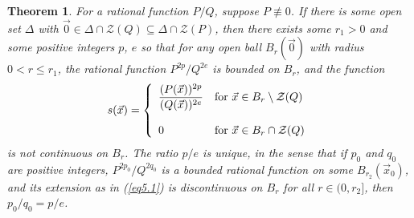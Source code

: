 \documentclass[12pt]{amsart}
\newtheorem{thm}{Theorem}[section]
\theoremstyle{definition}
\theoremstyle{remark}
\numberwithin{equation}{section}
\newcommand{\vv}{\mathcal{Z}}
\begin{document}
\begin{thm}\label{lem2.9}
  For a rational function $P/Q$, suppose $P\not\equiv0$.   If there is some open set $\Delta$ with $\vec0\in\Delta\cap\vv(Q)\subseteq\Delta\cap\vv(P)$, then there exists some $r_1>0$ and some positive integers $p$, $e$ so that for any open ball $B_r(\vec0)$ with radius $0<r\le r_1$, the rational function $P^{2p}/Q^{2e}$ is bounded on $B_r$, and the function
    \begin{equation}\label{eq5.1}
    s(\vec x)=\left\{\begin{array}{ll}{\displaystyle{\frac{(P(\vec x))^{2p}}{(Q(\vec x))^{2e}}}} & \mbox{\rm{for} $\vec x\in B_r\setminus\vv(Q)$}\\ & \\0& \mbox{\rm{for} $\vec x\in B_r\cap\vv(Q)$} \end{array}\right.
    \end{equation} is not continuous on $B_r$.  %
    The ratio $p/e$ is unique, in the sense that if $p_0$ and $q_0$ are positive integers, $P^{2p_0}/Q^{2q_0}$ is a bounded rational function on some $B_{r_2}(\vec x_0)$, and its extension as in \mbox{\rm{(\ref{eq5.1})}} is discontinuous on $B_r$ for all $r\in(0,r_2]$, then $p_0/q_0=p/e$.
\end{thm}
\end{document}
